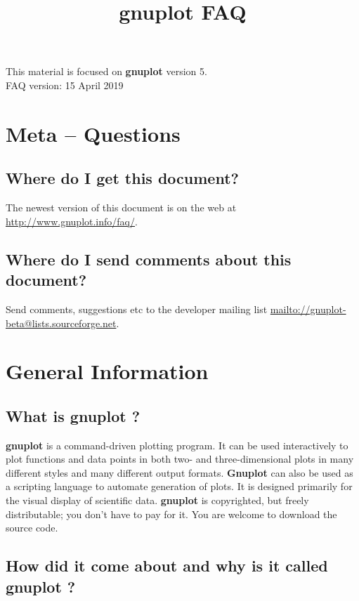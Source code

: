 \documentclass[a4paper,11pt]{article}
\def\http#1{{\small\href{http://#1}{\url{http://#1}}}}
\def\mailto#1{{\small\href{mailto://#1}{\url{mailto://#1}}}}
\newcommand{\mailto}[1]%
            {\htmladdnormallink{\latex{\url{<#1>}}\html{\textit{#1}}}%
                {mailto:#1}%
            }
\newcommand{\http}[1]%
            {\htmladdnormallink{\latex{\url{http://#1}}%
                    \html{\textit{http://#1}}}%
                {http://#1}%
            }
\newcommand{\gnuplot}{\textbf{gnuplot }}
\newcommand{\Gnuplot}{\textbf{Gnuplot }}
\begin{document}
\title{\gnuplot FAQ}
\author{}
\date{}
\maketitle

\noindent
This material is focused on \gnuplot version 5.
        \\
FAQ version: 15 April 2019


\tableofcontents

\newpage
\setcounter{section}{-1}
\section{Meta -- Questions}

\subsection{Where do I get this document?}

The newest version of this document is on the web at
\http{www.gnuplot.info/faq/}.

\subsection{Where do I send comments about this document?}

Send comments, suggestions etc to the developer mailing list
\mailto{gnuplot-beta@lists.sourceforge.net}.

\section{General Information}

\subsection{What is \gnuplot?}

\gnuplot is a command-driven plotting program.
It can be used interactively to plot functions and data points in
both two- and three-dimensional plots in many different styles and
many different output formats.  \Gnuplot can also be used as a
scripting language to automate generation of plots.
It is designed primarily for the visual display of scientific data.
\gnuplot is copyrighted, but freely distributable;
you don't have to pay for it. You are welcome to download the source code.


\subsection{How did it come about and why is it called \gnuplot?}
\end{document}
